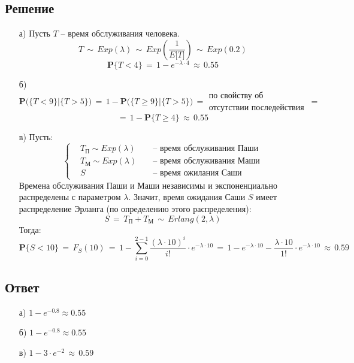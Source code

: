 \documentclass{article}
\begin{document}
\subsection*{Решение}
\begin{enumerate}
\item[а)] Пусть $ T $ -- время обслуживания человека.
\[ T \, \sim \, Exp(\lambda) \, \sim \, Exp \left( \dfrac{1}{E \big[ T \big]} \right) \, \sim \, Exp(0.2) \]
\[ \mathbf{P} \big\{ T \! < \! 4 \big\} \, = \, 1 \! - \! e^{-\lambda \cdot 4} \, \approx \, 0.55 \]
\item[б)]
\[ \mathbf{P} \bigg( \big\{ T \! < \! 9 \big\} \big| \big\{ T \! > \! 5 \big\} \bigg) \, = \, 1 \! - \! \mathbf{P} \bigg( \big\{ T \! \geqslant \! 9 \big\} \big| \big\{ T \! > \! 5 \big\} \bigg) \, = 
\begin{matrix}
\text{по свойству об} \\
\text{отсутствии последействия}
\end{matrix} \, = \]
\[ = \, 1 \! - \! \mathbf{P} \big\{ T \! \geqslant \! 4 \big\} \, \approx \, 0.55 \]
\item[в)] Пусть:
\begin{equation*}
\left\{
\begin{aligned}
& T_\text{П} \! \sim \! Exp(\lambda) \! & & \text{ -- время обслуживания Паши} \\
& T_\text{М} \! \sim \! Exp(\lambda) \! & & \text{ -- время обслуживания Маши} \\
& S & & \text{ -- время ожилания Саши}
\end{aligned}
\right.
\end{equation*}
Времена обслуживания Паши и Маши независимы и экспоненциально распределены с параметром $ \lambda $. Значит, время ожидания Саши $ S $ имеет распределение Эрланга (по определению этого распределения):
\[ S \, = \, T_\text{П} \! + \! T_\text{М} \, \sim \, Erlang(2,\lambda) \]
Тогда:
\[ \mathbf{P} \big\{ S \! < \! 10 \big\} \, = \, F_S(10) \, = \, 1 \! - \! \sum_{i=0}^{2-1} \dfrac{(\lambda \! \cdot \! 10)^i}{i!} \! \cdot \! e^{-\lambda \cdot 10} \, = \, 1 \! - \! e^{-\lambda \cdot 10} \! - \! \dfrac{\lambda \! \cdot \! 10}{1!} \! \cdot \! e^{-\lambda \cdot 10} \, \approx \, 0.59 \]
\end{enumerate}
\subsection*{Ответ}
\begin{enumerate}
\item[а)] $ 1 \! - \! e^{-0.8} \! \approx \! 0.55 $
\item[б)] $ 1 \! - \! e^{-0.8} \! \approx \! 0.55 $
\item[в)] $ 1 \! - \! 3 \! \cdot \! e^{-2} \, \approx \, 0.59 $
\end{enumerate}
\end{document}
